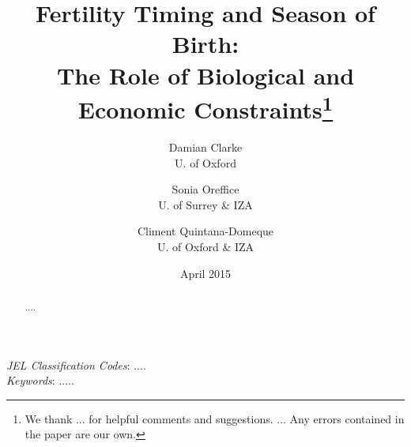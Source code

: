 \documentclass[a4paper, 11 pt]{article}
\theoremstyle{plain}
\begin{document}
\title{Fertility Timing and Season of Birth:\\ The Role of Biological and Economic Constraints\thanks{\scriptsize{We thank ... for helpful comments and suggestions. ... Any errors contained in the paper are our own.}}}
\author{Damian Clarke \\ U. of Oxford \and Sonia Oreffice \\ U. of Surrey \& IZA  \and Climent Quintana-Domeque \\ U. of Oxford \& IZA}
\date{April 2015}




\maketitle
\thispagestyle{empty}

\begin{abstract}
{....}
\end{abstract}
\emph{JEL Classification Codes}: ....\\
\emph{Keywords}: .....
\end{document}

